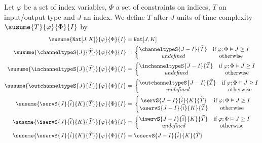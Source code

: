 \begin{defi}
Let $\varphi$ be a set of index variables, $\Phi$ a set of constraints on indices, $T$ an input/output type and $J$ an index. We define $T$ after $J$ units of time complexity $\susume{T}{\varphi}{\Phi}{I}$ by
\begin{align*}
    \susume{\texttt{Nat}[J,K]}{\varphi}{\Phi}{I} =&\; \texttt{Nat}[J,K]\\
    \susume{\channeltypeS{J}{\widetilde{T}}}{\varphi}{\Phi}{I} =&\; \left\{ \begin{matrix} 
     \channeltypeS{J-I}{\widetilde{T}} & \text{if}\; \varphi;\Phi \vDash J \geq I \\
    \textit{undefined}           & \text{otherwise}
\end{matrix} \right.\\
    \susume{\inchanneltypeS{J}{\widetilde{T}}}{\varphi}{\Phi}{I} =&\; \left\{ \begin{matrix} 
     \inchanneltypeS{J-I}{\widetilde{T}} & \text{if}\; \varphi;\Phi \vDash J \geq I \\
    \textit{undefined}           & \text{otherwise}
\end{matrix} \right.\\
    \susume{\outchanneltypeS{J}{\widetilde{T}}}{\varphi}{\Phi}{I} =&\; \left\{ \begin{matrix} 
     \outchanneltypeS{J-I}{\widetilde{T}} & \text{if}\; \varphi;\Phi \vDash J \geq I \\
    \textit{undefined}           & \text{otherwise}
\end{matrix} \right.\\
    \susume{\servS{J}{\widetilde{i}}{K}{\widetilde{T}}}{\varphi}{\Phi}{I} =&\; \left\{ \begin{matrix} 
     \servS{J - I}{\widetilde{i}}{K}{\widetilde{T}} & \text{if}\; \varphi;\Phi \vDash J \geq I \\
    \oservS{J - I}{\widetilde{i}}{K}{\widetilde{T}}           & \text{otherwise}
\end{matrix} \right.\\
    \susume{\iservS{J}{\widetilde{i}}{K}{\widetilde{T}}}{\varphi}{\Phi}{I} =&\; \left\{ \begin{matrix} 
     \iservS{J - I}{\widetilde{i}}{K}{\widetilde{T}} & \text{if}\; \varphi;\Phi \vDash J \geq I \\
    \textit{undefined}           & \text{otherwise}
\end{matrix} \right.\\
    \susume{\oservS{J}{\widetilde{i}}{K}{\widetilde{T}}}{\varphi}{\Phi}{I} =&\; \oservS{J - I}{\widetilde{i}}{K}{\widetilde{T}}
\end{align*}
\label{def:delaysized}
\end{defi}
